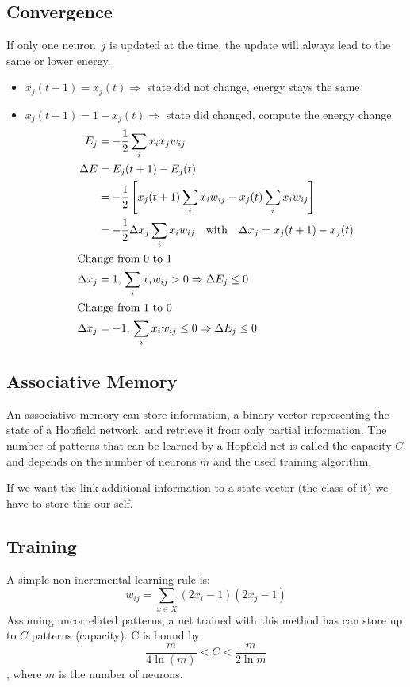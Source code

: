 \subsection{Convergence}
If only one neuron~$j$ is updated at the time, the update will always lead to the same or lower energy.
\begin{itemize}
\item $x_j(t+1) = x_j(t) \Rightarrow$ state did not change, energy stays the same
\item $x_j(t+1) = 1 - x_j(t) \Rightarrow$ state did changed, compute the energy change
	\begin{align}
	E_j &= -\frac{1}{2} \sum_i x_i x_j w_{ij}\\
	\Delta E &= E_j(t+1) - E_j(t)\\
	&= -\frac{1}{2} \left[ x_j(t+1) \sum_i x_i w_{ij} - x_j(t) \sum_i x_i w_{ij} \right]\\
	&= -\frac{1}{2} \Delta x_j \sum_i x_i w_{ij} \quad\text{with}\quad	\Delta x_j = x_j(t+1) - x_j(t)\\
	\intertext{Change from 0 to 1}
	\Delta x_j &= 1,\,\sum_i x_i w_{ij} > 0 \Rightarrow \Delta E_j \leq 0\\
	\intertext{Change from 1 to 0}
	\Delta x_j &= -1,\,\sum_i x_i w_{ij} \leq 0 \Rightarrow \Delta E_j \leq 0
	\end{align}
\end{itemize}

\subsection{Associative Memory}
An associative memory can store information, \eg a binary vector representing the state of a Hopfield network, and retrieve it from only partial information. The number of patterns that can be learned by a Hopfield net is called the capacity $C$ and depends on the number of neurons $m$ and the used training algorithm.

If we want the link additional information to a state vector (\eg the class of it) we have to store this our self.

\subsection{Training}
A simple non-incremental learning rule is:
\begin{equation}
w_{ij} = \sum_{x \in X} (2x_i-1)(2x_j-1)
\end{equation}
Assuming uncorrelated patterns, a net trained with this method has can store up to $C$ patterns (capacity). C is bound by
\begin{equation}
\frac{m}{4 \ln(m)} < C < \frac{m}{2\ln{m}}
\end{equation}
, where $m$ is the number of neurons.

